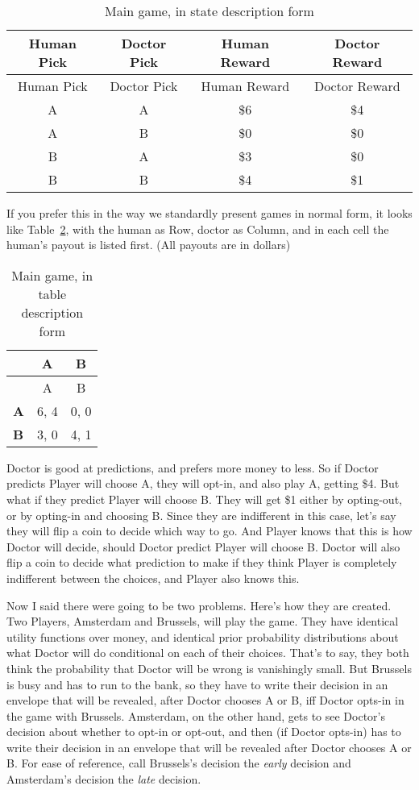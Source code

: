\documentclass[
  11pt,
  letterpaper,
  DIV=11,
  numbers=noendperiod,
  twoside]{scrartcl}
\begin{document}
\begin{longtable}[]{@{}cccc@{}}
\caption{Main game, in state description
form}\label{tbl-main-game-state}\tabularnewline
\toprule\noalign{}
Human Pick & Doctor Pick & Human Reward & Doctor Reward \\
\midrule\noalign{}
\endfirsthead
\toprule\noalign{}
Human Pick & Doctor Pick & Human Reward & Doctor Reward \\
\midrule\noalign{}
\endhead
\bottomrule\noalign{}
\endlastfoot
A & A & \$6 & \$4 \\
A & B & \$0 & \$0 \\
B & A & \$3 & \$0 \\
B & B & \$4 & \$1 \\
\end{longtable}

If you prefer this in the way we standardly present games in normal
form, it looks like Table~\ref{tbl-main-game-table}, with the human as
Row, doctor as Column, and in each cell the human's payout is listed
first. (All payouts are in dollars)

\begin{longtable}[]{@{}lcc@{}}
\caption{Main game, in table description
form}\label{tbl-main-game-table}\tabularnewline
\toprule\noalign{}
& A & B \\
\midrule\noalign{}
\endfirsthead
\toprule\noalign{}
& A & B \\
\midrule\noalign{}
\endhead
\bottomrule\noalign{}
\endlastfoot
\textbf{A} & 6, 4 & 0, 0 \\
\textbf{B} & 3, 0 & 4, 1 \\
\end{longtable}

Doctor is good at predictions, and prefers more money to less. So if
Doctor predicts Player will choose A, they will opt-in, and also play A,
getting \$4. But what if they predict Player will choose B. They will
get \$1 either by opting-out, or by opting-in and choosing B. Since they
are indifferent in this case, let's say they will flip a coin to decide
which way to go. And Player knows that this is how Doctor will decide,
should Doctor predict Player will choose B. Doctor will also flip a coin
to decide what prediction to make if they think Player is completely
indifferent between the choices, and Player also knows this.

Now I said there were going to be two problems. Here's how they are
created. Two Players, Amsterdam and Brussels, will play the game. They
have identical utility functions over money, and identical prior
probability distributions about what Doctor will do conditional on each
of their choices. That's to say, they both think the probability that
Doctor will be wrong is vanishingly small. But Brussels is busy and has
to run to the bank, so they have to write their decision in an envelope
that will be revealed, after Doctor chooses A or B, iff Doctor opts-in
in the game with Brussels. Amsterdam, on the other hand, gets to see
Doctor's decision about whether to opt-in or opt-out, and then (if
Doctor opts-in) has to write their decision in an envelope that will be
revealed after Doctor chooses A or B. For ease of reference, call
Brussels's decision the \emph{early} decision and Amsterdam's decision
the \emph{late} decision.
\end{document}
